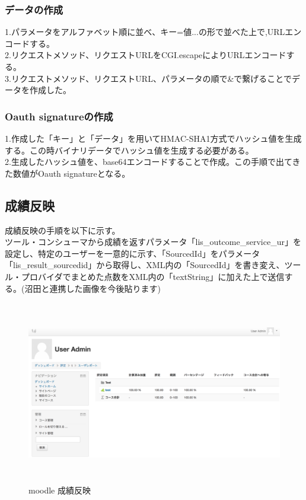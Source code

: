 \subsubsection{データの作成}
1.パラメータをアルファベット順に並べ、キー=値...の形で並べた上で,URLエンコードする。\\
2.リクエストメソッド、リクエストURLをCGI.escapeによりURLエンコードする。\\
3.リクエストメソッド、リクエストURL、パラメータの順で&で繋げることでデータを作成した。\\
\subsubsection{Oauth signatureの作成}
1.作成した「キー」と「データ」を用いてHMAC-SHA1方式でハッシュ値を生成する。この時バイナリデータでハッシュ値を生成する必要がある。\\
2.生成したハッシュ値を、base64エンコードすることで作成。この手順で出てきた数値がOauth signatureとなる。\\
\subsection{成績反映}
成績反映の手順を以下に示す。\\
ツール・コンシューマから成績を返すパラメータ「lis\_outcome\_service\_ur」を設定し、特定のユーザーを一意的に示す、「SourcedId」をパラメータ「lis\_result\_sourcedid」から取得し、XML内の「SourcedId」を書き変え、ツール・プロバイダでまとめた点数をXML内の「textString」に加えた上で送信する。(沼田と連携した画像を今後貼ります)\\
\newpage
\begin{figure}[htbp]
  \begin{center}
    \includegraphics[clip,width=12.0cm,height=8.0cm]{img/score.png}
    \caption{moodle 成績反映}
    \label{fig:moodle score}
  \end{center}
\end{figure}
